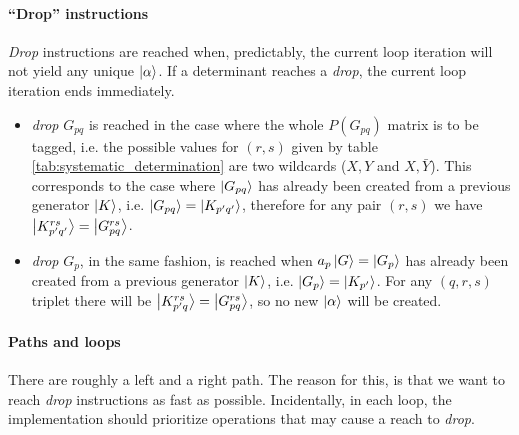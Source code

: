 \documentclass[./thesis.tex]{subfiles}
\begin{document}
\paragraph{``Drop'' instructions}
\emph{Drop} instructions are reached when, predictably, the current loop iteration will not yield any unique ${\ket{\alpha}}$. If a determinant reaches a \emph{drop}, the current loop iteration ends immediately.

\begin{itemize}
\item
\emph{drop} $G_{pq}$ is reached in the case where the whole $P(G_{pq})$ matrix is to be tagged, i.e. the possible values for $(r,s)$ given by table \ref{tab:systematic_determination} are two wildcards ($X,Y$ and $X,\bar Y$).
This corresponds to the case where $\ket {G_{pq}}$ has already been created from a previous generator $\ket K$, i.e. $\ket {G_{pq}} = \ket {K_{p'q'}}$, therefore for any pair $(r,s)$ we have $\ket {K_{p'q'}^{rs}} = \ket {G_{pq}^{rs}}$.\\
\item
\emph{drop} $G_{p}$, in the same fashion, is reached when $a_p \ket G = \ket {G_{p}}$ has already been created from a previous generator $\ket K$, i.e. $\ket {G_{p}} = \ket{K_{p'}}$. For any $(q,r,s)$ triplet there will be $\ket {K_{p'q}^{rs}} = \ket {G_{pq}^{rs}}$, so no new ${\ket{\alpha}}$ will be created.
\end{itemize}


\paragraph{Paths and loops}
There are roughly a left and a right path. The reason for this, is that we want to reach \emph{drop} instructions as fast as possible. Incidentally, in each loop, the implementation should prioritize operations that may cause a reach to \emph{drop}.

\end{document}
